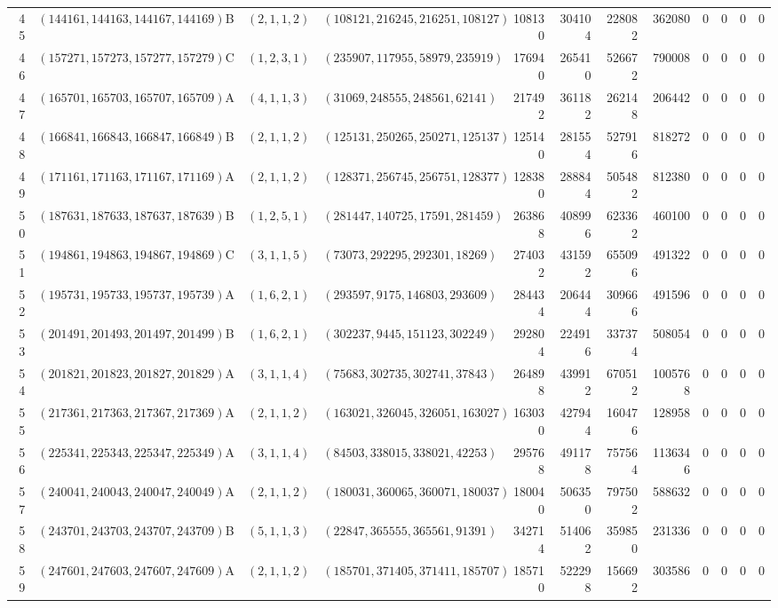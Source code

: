 \begin{longtable}{r l c l l r r r r c c c c}
45 & $(144161,144163,144167,144169)$ & B & $(2,1,1,2)$ & $(108121,216245,216251,108127)$ & 108130 & 304104 & 228082 & 362080 & 0 & 0 & 0 & 0\\
46 & $(157271,157273,157277,157279)$ & C & $(1,2,3,1)$ & $(235907,117955,58979,235919)$ & 176940 & 265410 & 526672 & 790008 & 0 & 0 & 0 & 0\\
47 & $(165701,165703,165707,165709)$ & A & $(4,1,1,3)$ & $(31069,248555,248561,62141)$ & 217492 & 361182 & 262148 & 206442 & 0 & 0 & 0 & 0\\
48 & $(166841,166843,166847,166849)$ & B & $(2,1,1,2)$ & $(125131,250265,250271,125137)$ & 125140 & 281554 & 527916 & 818272 & 0 & 0 & 0 & 0\\
49 & $(171161,171163,171167,171169)$ & A & $(2,1,1,2)$ & $(128371,256745,256751,128377)$ & 128380 & 288844 & 505482 & 812380 & 0 & 0 & 0 & 0\\
50 & $(187631,187633,187637,187639)$ & B & $(1,2,5,1)$ & $(281447,140725,17591,281459)$ & 263868 & 408996 & 623362 & 460100 & 0 & 0 & 0 & 0\\
51 & $(194861,194863,194867,194869)$ & C & $(3,1,1,5)$ & $(73073,292295,292301,18269)$ & 274032 & 431592 & 655096 & 491322 & 0 & 0 & 0 & 0\\
52 & $(195731,195733,195737,195739)$ & A & $(1,6,2,1)$ & $(293597,9175,146803,293609)$ & 284434 & 206444 & 309666 & 491596 & 0 & 0 & 0 & 0\\
53 & $(201491,201493,201497,201499)$ & B & $(1,6,2,1)$ & $(302237,9445,151123,302249)$ & 292804 & 224916 & 337374 & 508054 & 0 & 0 & 0 & 0\\
54 & $(201821,201823,201827,201829)$ & A & $(3,1,1,4)$ & $(75683,302735,302741,37843)$ & 264898 & 439912 & 670512 & 1005768 & 0 & 0 & 0 & 0\\
55 & $(217361,217363,217367,217369)$ & A & $(2,1,1,2)$ & $(163021,326045,326051,163027)$ & 163030 & 427944 & 160476 & 128958 & 0 & 0 & 0 & 0\\
56 & $(225341,225343,225347,225349)$ & A & $(3,1,1,4)$ & $(84503,338015,338021,42253)$ & 295768 & 491178 & 757564 & 1136346 & 0 & 0 & 0 & 0\\
57 & $(240041,240043,240047,240049)$ & A & $(2,1,1,2)$ & $(180031,360065,360071,180037)$ & 180040 & 506350 & 797502 & 588632 & 0 & 0 & 0 & 0\\
58 & $(243701,243703,243707,243709)$ & B & $(5,1,1,3)$ & $(22847,365555,365561,91391)$ & 342714 & 514062 & 359850 & 231336 & 0 & 0 & 0 & 0\\
59 & $(247601,247603,247607,247609)$ & A & $(2,1,1,2)$ & $(185701,371405,371411,185707)$ & 185710 & 522298 & 156692 & 303586 & 0 & 0 & 0 & 0\\

\end{longtable}
